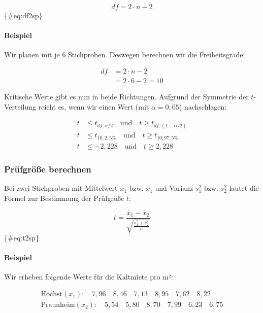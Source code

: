 \documentclass[
  ngerman,
]{article}
\begin{document}
\[
\mathit{df}=2\cdot n -2
\]\{\#eq:df2sp\}

\hypertarget{beispiel-14}{%
\paragraph{Beispiel}\label{beispiel-14}}

Wir planen mit je 6 Stichproben. Deswegen berechnen wir die Freiheitsgrade:

\[\begin{aligned}
\mathit{df}&=2\cdot n -2\\[4pt]
&=2\cdot6-2=10 
\end{aligned}\]

Kritische Werte gibt es nun in beide Richtungen. Aufgrund der Symmetrie der \(t\)-Verteilung reicht es, wenn wir einen Wert (mit \(\alpha=0{,}05\)) nachschlagen:

\[\begin{aligned}
t &\leq t_{\mathit{df};\alpha/2} \quad \textrm{und} \quad t \geq t_{\mathit{df};(1-\alpha/2)}\\[4pt]
t &\leq t_{10;2{,}5\%} \quad \textrm{und} \quad t \geq t_{10;97{,}5\%}\\[4pt]
t &\leq -2{,}228 \quad \textrm{und} \quad t \geq 2{,}228
\end{aligned}\]

\hypertarget{pruxfcfgruxf6uxdfe-berechnen-2}{%
\subsubsection{Prüfgröße berechnen}\label{pruxfcfgruxf6uxdfe-berechnen-2}}

Bei zwei Stichproben mit Mittelwert \(\bar{x}_1\) bzw. \(\bar{x}_1\) und Varianz \(s^2_1\) bzw. \(s^2_2\) lautet die Formel zur Bestimmung der Prüfgröße \(t\):

\[
t=\frac{\bar{x}_1-\bar{x}_2}{\sqrt{\frac{s^2_1+s^2_2}{n}}}
\]\{\#eq:t2sp\}

\hypertarget{beispiel-15}{%
\paragraph{Beispiel}\label{beispiel-15}}

Wir erheben folgende Werte für die Kaltmiete pro m²:

\[\begin{aligned}
\textrm{Höchst} (x_1):\quad7{,}96\quad8{,}46\quad7{,}13\quad8{,}95\quad7{,}62\quad8{,}22\\[4pt]
\textrm{Praunheim} (x_2):\quad5{,}54\quad5{,}80\quad8{,}70\quad7{,}99\quad6{,}23\quad6{,}75
\end{aligned}\]
\end{document}
